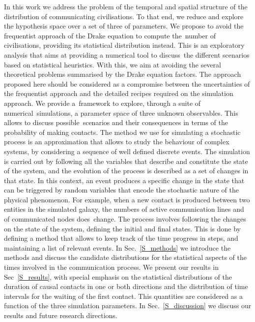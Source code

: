 \documentclass[crop]{CSLB}
\begin{document}
In this work we address the problem of the temporal and spatial
structure of the distribution of communicating civilisations.
%
To that end, we reduce and explore the hypothesis space over a set of
three of parameters.
%
We propose to avoid the frequentist approach of the Drake equation to
compute the number of civilisations, providing its statistical
distribution instead.
%
This is an exploratory analysis that aims at providing a numerical
tool to discuss the different scenarios based on statistical
heuristics.
%
With this, we aim at avoiding the several theoretical problems
summarised by the Drake equation factors.
%
The approach proposed here should be considered as a compromise
between the uncertainties of the frequentist approach and the detailed
recipes required on the simulation approach.
%
We provide a framework to explore, through a suite of
numerical simulations, a parameter space of three unknown observables.
%
This allows to discuss possible scenarios and their consequences in
terms of the probability of making contacts.
%
The method we use for simulating a stochastic process is an
approximation that allows to study the behaviour of complex systems,
by considering a sequence of well defined discrete events.
%
The simulation is carried out by following all the variables that
describe and constitute the state of the system, and the evolution of
the process is described as a set of changes in that state.
%
In this context, an event produces a specific change in the state that
can be triggered by random variables that encode the stochastic nature
of the physical phenomenon.
%
For example, when a new contact is produced between two entities in
the simulated galaxy, the numbers of active communication lines and of
communicated nodes does change.
%
The process involves following the changes on the state of the system,
defining the initial and final states.
%
This is done by defining a method that allows to keep track of the
time progress in steps, and maintaining a list of relevant events.
%
In Sec.~\ref{S_methods} we introduce the methods and discuss the
candidate distributions for the statistical aspects of the times
involved in the communication process.
%
We present our results in Sec~\ref{S_results}, with special emphasis
on the statistical distributions of the duration of causal contacts in
one or both directions and the distribution of time intervals for the
waiting of the first contact.
%
This quantities are considered as a function of the three simulation
parameters.
%
In Sec.~\ref{S_discussion} we discuss our results and future research
directions.   
\end{document}
